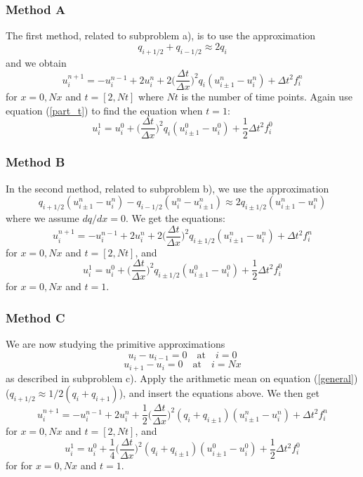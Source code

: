\documentclass[norsk,a4paper,12pt]{article}
\begin{document}
\subsubsection{Method A}
The first method, related to subproblem a), is to use the approximation
\begin{equation*}
q_{i+1/2}+q_{i-1/2}\approx2q_i
\end{equation*}
and we obtain
\begin{equation}
u_i^{n+1}=-u_i^{n-1}+2u_i^n+2\bigg(\frac{\Delta t}{\Delta x}\bigg)^2q_i(u_{i\pm1}^n-u_i^n)+\Delta t^2f_i^n
\end{equation}
for $x=0,Nx$ and $t=[2,Nt]$ where $Nt$ is the number of time points. Again use equation (\ref{part_t}) to find the equation when $t=1$:
\begin{equation}
u_i^1=u_i^0+\bigg(\frac{\Delta t}{\Delta x}\bigg)^2q_i(u_{i\pm1}^0-u_i^0)+\frac{1}{2}\Delta t^2f_i^0
\end{equation}


\subsubsection{Method B}
In the second method, related to subproblem b), we use the approximation
\begin{equation*}
q_{i+1/2}(u_{i\pm1}^n-u_i^n)-q_{i-1/2}(u_i^n-u_{i\pm1}^n)\approx2q_{i\pm1/2}(u_{i\pm1}^n-u_i^n)
\end{equation*}
where we assume $dq/dx=0$. We get the equations:
\begin{equation}
u_i^{n+1}=-u_i^{n-1}+2u_i^n+2\bigg(\frac{\Delta t}{\Delta x}\bigg)^2q_{i\pm1/2}(u_{i\pm1}^n-u_i^n)+\Delta t^2f_i^n
\end{equation}
for $x=0,Nx$ and $t=[2,Nt]$, and
\begin{equation}
u_i^1=u_i^0+\bigg(\frac{\Delta t}{\Delta x}\bigg)^2q_{i\pm1/2}(u_{i\pm1}^0-u_i^0)+\frac{1}{2}\Delta t^2f_i^0
\end{equation}
for $x=0,Nx$ and $t=1$.

\subsubsection{Method C}
We are now studying the primitive approximations
\begin{equation*}
u_i-u_{i-1}=0\quad\text{at}\quad i=0
\end{equation*}
\begin{equation*}
u_{i+1}-u_i=0\quad\text{at}\quad i=Nx
\end{equation*}
as described in subproblem c). Apply the arithmetic mean on equation (\ref{general}) ($q_{i+1/2}\approx1/2(q_i+q_{i+1})$), and insert the equations above. We then get
\begin{equation}
u_i^{n+1}=-u_i^{n-1}+2u_i^n+\frac{1}{2}\bigg(\frac{\Delta t}{\Delta x}\bigg)^2(q_i+q_{i\pm1})(u_{i\pm1}^n-u_i^n)+\Delta t^2f_i^n
\end{equation}
for $x=0,Nx$ and $t=[2,Nt]$, and
\begin{equation}
u_i^1=u_i^0+\frac{1}{4}\bigg(\frac{\Delta t}{\Delta x}\bigg)^2(q_i+q_{i\pm1})(u_{i\pm1}^0-u_i^0)+\frac{1}{2}\Delta t^2f_i^0
\end{equation}
for for $x=0,Nx$ and $t=1$.
\end{document}
